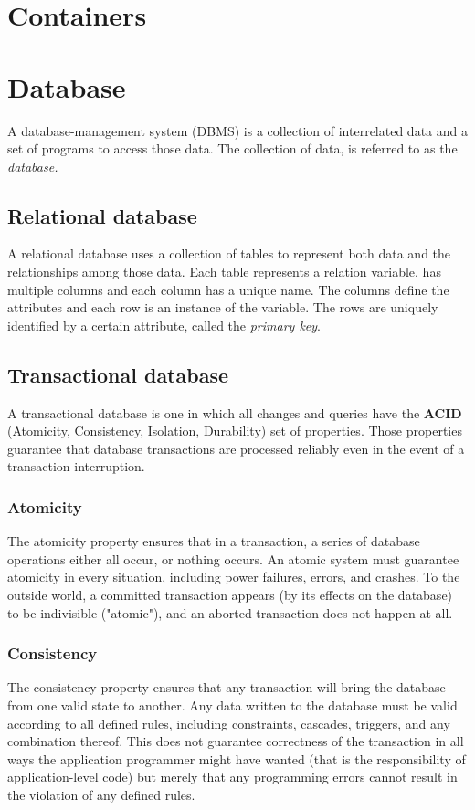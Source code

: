 \section{Containers}

\section{Database}
  A database-management system (DBMS) \cite{dbms-sil} is a collection of interrelated data and a set of programs to access those data. The collection of data, is referred to as the \emph{database.}

  \subsection{Relational database}
    A relational database uses a collection of tables to represent both data and the relationships among those data. Each table represents a relation variable, has multiple columns and each column has a unique name. The columns define the attributes and each row is an instance of the variable. The rows are uniquely identified by a certain attribute, called the \emph{primary key}.

  \subsection{Transactional database}
    A transactional database is one in which all changes and queries have the \textbf{ACID} \cite{acid} (Atomicity, Consistency, Isolation, Durability) set of properties. Those properties guarantee that database transactions are processed reliably even in the event of a transaction interruption.

    \subsubsection{Atomicity}
      The atomicity property ensures that in a transaction, a series of database operations either all occur, or nothing occurs. An atomic system must guarantee atomicity in every situation, including power failures, errors, and crashes. To the outside world, a committed transaction appears (by its effects on the database) to be indivisible ("atomic"), and an aborted transaction does not happen at all.

    \subsubsection{Consistency}
      The consistency property ensures that any transaction will bring the database from one valid state to another. Any data written to the database must be valid according to all defined rules, including constraints, cascades, triggers, and any combination thereof. This does not guarantee correctness of the transaction in all ways the application programmer might have wanted (that is the responsibility of application-level code) but merely that any programming errors cannot result in the violation of any defined rules.

